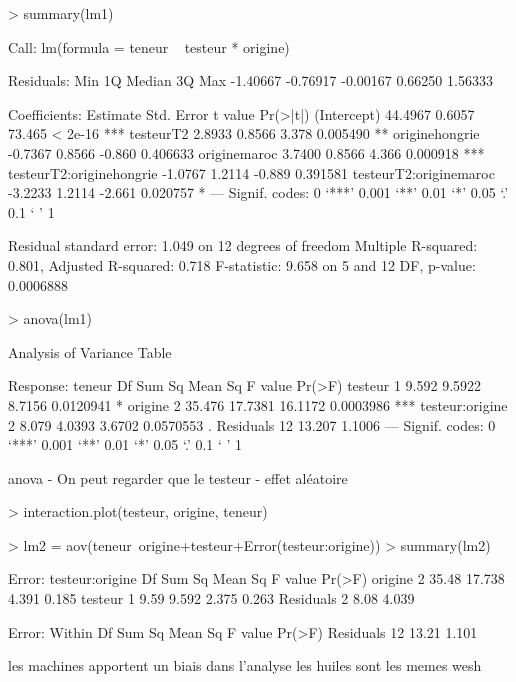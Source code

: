 \documentclass{article}
\begin{document}
\begin{Schunk}
\begin{Sinput}
> summary(lm1)
\end{Sinput}
\begin{Soutput}
Call:
lm(formula = teneur ~ testeur * origine)

Residuals:
     Min       1Q   Median       3Q      Max 
-1.40667 -0.76917 -0.00167  0.66250  1.56333 

Coefficients:
                         Estimate Std. Error t value Pr(>|t|)    
(Intercept)               44.4967     0.6057  73.465  < 2e-16 ***
testeurT2                  2.8933     0.8566   3.378 0.005490 ** 
originehongrie            -0.7367     0.8566  -0.860 0.406633    
originemaroc               3.7400     0.8566   4.366 0.000918 ***
testeurT2:originehongrie  -1.0767     1.2114  -0.889 0.391581    
testeurT2:originemaroc    -3.2233     1.2114  -2.661 0.020757 *  
---
Signif. codes:  0 ‘***’ 0.001 ‘**’ 0.01 ‘*’ 0.05 ‘.’ 0.1 ‘ ’ 1

Residual standard error: 1.049 on 12 degrees of freedom
Multiple R-squared:  0.801,	Adjusted R-squared:  0.718 
F-statistic: 9.658 on 5 and 12 DF,  p-value: 0.0006888
\end{Soutput}
\begin{Sinput}
> anova(lm1)
\end{Sinput}
\begin{Soutput}
Analysis of Variance Table

Response: teneur
                Df Sum Sq Mean Sq F value    Pr(>F)    
testeur          1  9.592  9.5922  8.7156 0.0120941 *  
origine          2 35.476 17.7381 16.1172 0.0003986 ***
testeur:origine  2  8.079  4.0393  3.6702 0.0570553 .  
Residuals       12 13.207  1.1006                      
---
Signif. codes:  0 ‘***’ 0.001 ‘**’ 0.01 ‘*’ 0.05 ‘.’ 0.1 ‘ ’ 1
\end{Soutput}
\end{Schunk}
anova - On peut regarder que le testeur - effet aléatoire

\begin{Schunk}
\begin{Sinput}
> interaction.plot(testeur, origine, teneur)
\end{Sinput}
\end{Schunk}

\begin{Schunk}
\begin{Sinput}
> lm2 = aov(teneur~origine+testeur+Error(testeur:origine))
> summary(lm2)
\end{Sinput}
\begin{Soutput}
Error: testeur:origine
          Df Sum Sq Mean Sq F value Pr(>F)
origine    2  35.48  17.738   4.391  0.185
testeur    1   9.59   9.592   2.375  0.263
Residuals  2   8.08   4.039               

Error: Within
          Df Sum Sq Mean Sq F value Pr(>F)
Residuals 12  13.21   1.101               
\end{Soutput}
\end{Schunk}
les machines apportent un biais dans l'analyse
les huiles sont les memes wesh
\end{document}

